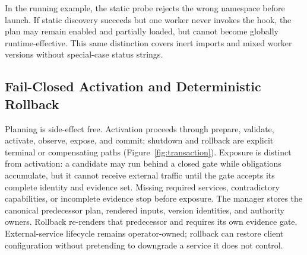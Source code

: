 \documentclass[letterpaper,twocolumn,10pt]{article}
\begin{document}
In the running example, the static probe rejects the wrong namespace before
launch.  If static discovery succeeds but one worker never invokes the hook,
the plan may remain enabled and partially loaded, but cannot become globally
runtime-effective.  This same distinction covers inert imports and mixed
worker versions without special-case status strings.

\subsection{Fail-Closed Activation and Deterministic Rollback}
Planning is side-effect free.  Activation proceeds through prepare, validate,
activate, observe, expose, and commit; shutdown and rollback are explicit
terminal or compensating paths (Figure~\ref{fig:transaction}).  Exposure is distinct from activation: a
candidate may run behind a closed gate while obligations accumulate, but it
cannot receive external traffic until the gate accepts its complete identity
and evidence set.  Missing required services, contradictory capabilities, or
incomplete evidence stop before exposure.  The manager stores the canonical
predecessor plan, rendered inputs, version identities, and authority owners.
Rollback re-renders that predecessor and requires its own evidence gate.
External-service lifecycle remains operator-owned; rollback can restore client
configuration without pretending to downgrade a service it does not control.
\end{document}
